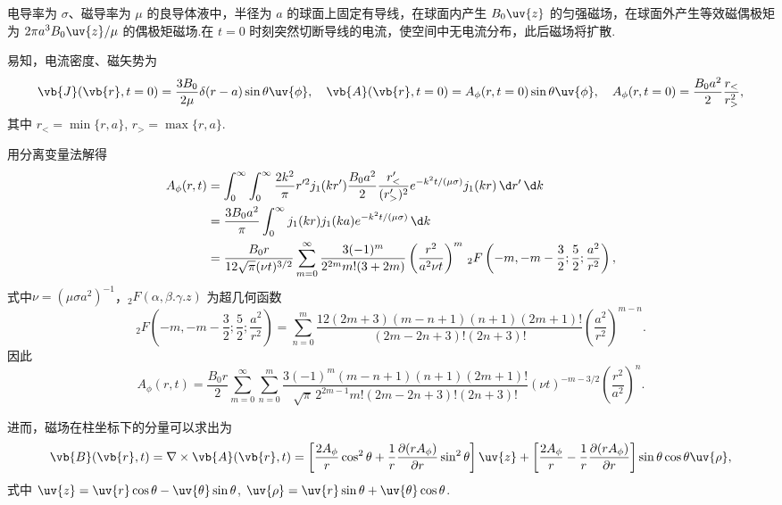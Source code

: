 \begin{example}
	电导率为 \(\sigma\)、磁导率为 \(\mu\) 的良导体液中，半径为 \(a\) 的球面上固定有导线，在球面内产生 \(B_0 \uv{z}\) 的匀强磁场，在球面外产生等效磁偶极矩为 \(2\pi a^3 B_0 \uv{z}/\mu\) 的偶极矩磁场.在 \(t=0\) 时刻突然切断导线的电流，使空间中无电流分布，此后磁场将扩散.

	易知，电流密度、磁矢势为
	\begin{equation*}
		\vb{J}(\vb{r}, t=0) = \frac{3B_0}{2\mu} \delta(r-a) \sin\theta \uv{\phi},\quad
		\vb{A}(\vb{r}, t=0)= A_\phi(r,t=0) \sin\theta \uv{\phi},\quad
		A_\phi(r,t=0) = \frac{B_0 a^2}{2} \frac{r_<}{r_>^2},
	\end{equation*}
	其中 \(r_< = \min\{r,a\}\), \(r_> = \max\{r,a\}\).

	用分离变量法解得
	\begin{align*}
		A_\phi(r,t) & = \int_0^\infty \int_0^\infty \frac{2k^2}{\pi} r'^2 j_1(kr') \frac{B_0 a^2}{2} \frac{r'_<}{(r'_>)^2} e^{-k^2 t/(\mu\sigma)} j_1(kr) \,\d r' \,\d k                                             \\
		            & = \frac{3B_0 a^2}{\pi} \int_0^\infty j_1(kr) j_1(ka) e^{-k^2 t/(\mu\sigma)} \,\d k                                                                                                             \\
		            & = \frac{B_0 r}{12\sqrt{\pi} (\nu t)^{3/2}} \sum_{m=0}^\infty \frac{3(-1)^m}{2^{2m} m! (3+2m)} \left(\frac{r^2}{a^2 \nu t}\right)^m \,_2F\left(-m, -m-\frac32; \frac52; \frac{a^2}{r^2}\right),
	\end{align*}
	式中\(\nu = (\mu\sigma a^2)^{-1}\)，\(_2F(\alpha,\beta.\gamma.z)\) 为超几何函数
	\begin{equation*}
		_2F\!\left(-m, -m-\frac32; \frac52; \frac{a^2}{r^2}\right) = \sum_{n=0}^m \frac{12(2m+3)(m-n+1)(n+1)(2m+1)!}{(2m-2n+3)! (2n+3)!} \left(\frac{a^2}{r^2}\right)^{m-n}.
	\end{equation*}
	因此
	\begin{equation*}
		A_\phi(r,t) = \frac{B_0 r}{2} \sum_{m=0}^\infty \sum_{n=0}^m \frac{3(-1)^m (m-n+1)(n+1)(2m+1)!}{\sqrt{\pi}\,2^{2m-1} m! (2m-2n+3)! (2n+3)!} (\nu t)^{-m-3/2} \left(\frac{r^2}{a^2}\right)^n.
	\end{equation*}

	进而，磁场在柱坐标下的分量可以求出为
	\begin{align*}
		\vb{B}(\vb{r},t) = \nabla \times \vb{A}(\vb{r},t)
		= \left[\frac{2A_\phi}{r} \cos^2\theta + \frac{1}{r} \frac{\partial(rA_\phi)}{\partial r} \sin^2\theta\right] \uv{z}
		+ \left[\frac{2A_\phi}{r} - \frac{1}{r} \frac{\partial(rA_\phi)}{\partial r}\right] \sin\theta \cos\theta \uv{\rho},
	\end{align*}
	式中 \(\uv{z} = \uv{r}\cos\theta - \uv{\theta}\sin\theta\), \(\uv{\rho} = \uv{r}\sin\theta + \uv{\theta}\cos\theta\).


\end{example}
